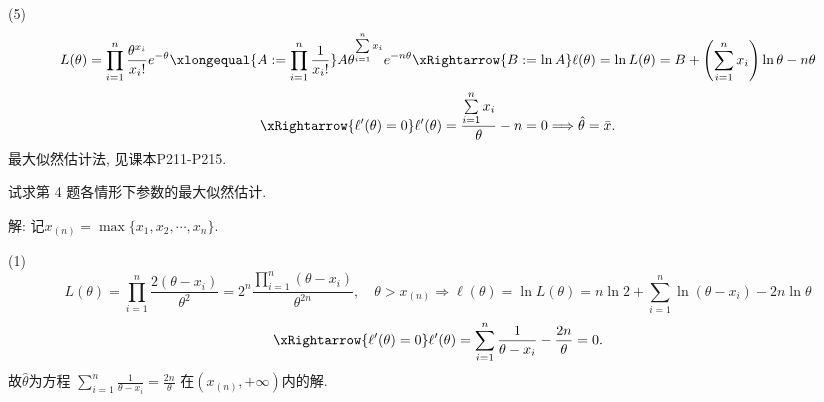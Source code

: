 \documentclass[standard]{ExBook}
\renewenvironment{shaded}{%
  \def\FrameCommand{\fboxsep=\FrameSep \colorbox{shadecolor}}%
  \MakeFramed{\advance\hsize-\width \FrameRestore}%
}{%
  \endMakeFramed
}
\begin{document}
\begin{qitems}
(5)
$$
L(\theta)=\prod_{i=1}^{n}\frac{\theta^{x_i}}{x_i!}e^{-\theta}
\xlongequal{A:=\prod_{i=1}^{n}\frac{1}{x_i!}}
A\theta^{\sum\limits_{i=1}^{n}x_i}e^{-n\theta}
\xRightarrow{B:=\ln A}
\ell(\theta)
=\ln L(\theta)
=B+\left(\sum_{i=1}^{n}x_i\right)\ln\theta-n\theta
$$
$$
\xRightarrow{\ell'(\theta)=0}
\ell'(\theta)
=
\frac{\sum\limits_{i=1}^{n}x_i}{\theta}-n
=0
\Longrightarrow
\hat{\theta}=\bar{x}.
$$
\textcolor{themeColor}{\selectfont {} 最大似然估计法, 见课本P211-P215.}

\vspace{2.5cm-5em}

    \begin{bbox}
    \begin{shaded}
        \qitem
试求第 4 题各情形下参数的最大似然估计.
    \end{shaded}
    \end{bbox}

\vspace{\dimexpr2.5cm-5em\relax}

解: 记$x_{(n)}=\max\{x_1,x_2,\cdots,x_n\}$.

(1)
$$
L(\theta)
=\prod_{i=1}^{n}\frac{2(\theta-x_i)}{\theta^2}
=2^n\frac{\prod\limits_{i=1}^{n}(\theta-x_i)}{\theta^{2n}},
\quad \theta>x_{(n)}
\Longrightarrow
\ell(\theta)=\ln L(\theta)
=n\ln2+\sum_{i=1}^{n}\ln(\theta-x_i)-2n\ln\theta
$$
$$
\xRightarrow{\ell'(\theta)=0}
\ell'(\theta)
=\sum_{i=1}^{n}\frac{1}{\theta-x_i}-\frac{2n}{\theta}=0.
$$
故$\hat{\theta}$为方程
$
\sum\limits_{i=1}^{n}\frac{1}{\theta-x_i}=\frac{2n}{\theta}
$
在$(x_{(n)},+\infty)$内的解.


\end{qitems}
\end{document}
